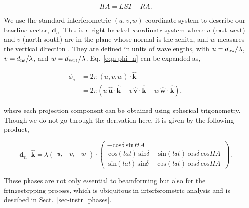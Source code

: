 \begin{equation}
HA = LST - RA.
\end{equation}

We use the standard interferometric $(u, v, w)$ coordinate system 
to describe our baseline vector, $\mathbf{d}_n$. This is a 
right-handed coordinate system where $u$ (east-west) and $v$ (north-south) are in the plane 
whose normal is the zenith, and $w$ measures the vertical direction \citep{1986isra.book.....T}.
They are defined in units of wavelengths, with
$u = d_{\rm ew} / \lambda$, $v = d_{\rm ns} / \lambda$, 
and $w = d_{\rm vert} / \lambda$. Eq.~\ref{eqn-phi_n} can be expanded 
as,

\begin{align}   
\phi_n &= 2\pi \, (u, v, w) \cdot \mathbf{\hat{k}}\\
&= 2 \pi \left ( 
u \, \mathit{\mathbf{\hat{u}}} \cdot \mathbf{\hat{k}} + 
v \, \mathbf{\hat{v}} \cdot \mathbf{\hat{k}} + 
w \, \mathbf{\hat{w}} \cdot \mathbf{\hat{k}} 
\right ),
\end{align}

\noindent where each projection component can be obtained 
using spherical trigonometry. Though we do not go through the
derivation here, it is given by the following product,

\begin{equation}
\label{eq-fringestop_phase}
\mathbf{d}_n \cdot  {\mathbf{\hat{k}}} = \lambda \begin{pmatrix}
u, & v, & w
\end{pmatrix}  \cdot \begin{pmatrix} 
-\mathrm{cos}\delta \,\mathrm{sin}HA \\ 
\, \mathrm{cos}(lat) \, \mathrm{sin}\delta - \mathrm{sin}(lat) \, \mathrm{cos}\delta \, \mathrm{cos}HA \,\\
\, \mathrm{sin}(lat) \, \mathrm{sin}\delta + \mathrm{cos}(lat) \, \mathrm{cos}\delta \, \mathrm{cos} HA\,
\end{pmatrix} .
\end{equation}

These phases are not only essential to beamforming but 
also for the fringestopping process, which is ubiquitous in 
interferometric analysis and is descibed in Sect.~\ref{sec-instr_phases}.


